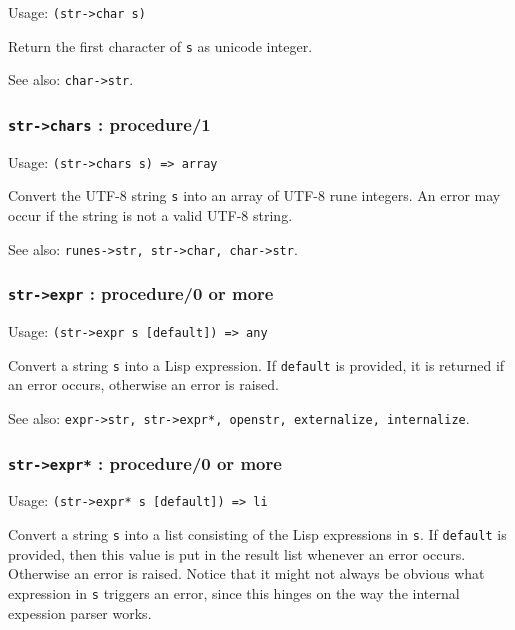 \documentclass[
]{article}
\newcommand{\passthrough}[1]{#1}
\begin{document}
Usage: \passthrough{\lstinline!(str->char s)!}

Return the first character of \passthrough{\lstinline!s!} as unicode
integer.

See also: \passthrough{\lstinline!char->str!}.

\hypertarget{str-chars-procedure1}{%
\subsubsection{\texorpdfstring{\texttt{str-\textgreater{}chars} :
procedure/1}{str-\textgreater chars : procedure/1}}\label{str-chars-procedure1}}

Usage: \passthrough{\lstinline!(str->chars s) => array!}

Convert the UTF-8 string \passthrough{\lstinline!s!} into an array of
UTF-8 rune integers. An error may occur if the string is not a valid
UTF-8 string.

See also: \passthrough{\lstinline!runes->str, str->char, char->str!}.

\hypertarget{str-expr-procedure0-or-more}{%
\subsubsection{\texorpdfstring{\texttt{str-\textgreater{}expr} :
procedure/0 or
more}{str-\textgreater expr : procedure/0 or more}}\label{str-expr-procedure0-or-more}}

Usage: \passthrough{\lstinline!(str->expr s [default]) => any!}

Convert a string \passthrough{\lstinline!s!} into a Lisp expression. If
\passthrough{\lstinline!default!} is provided, it is returned if an
error occurs, otherwise an error is raised.

See also:
\passthrough{\lstinline!expr->str, str->expr*, openstr, externalize, internalize!}.

\hypertarget{str-expr-procedure0-or-more-1}{%
\subsubsection{\texorpdfstring{\texttt{str-\textgreater{}expr*} :
procedure/0 or
more}{str-\textgreater expr* : procedure/0 or more}}\label{str-expr-procedure0-or-more-1}}

Usage: \passthrough{\lstinline!(str->expr* s [default]) => li!}

Convert a string \passthrough{\lstinline!s!} into a list consisting of
the Lisp expressions in \passthrough{\lstinline!s!}. If
\passthrough{\lstinline!default!} is provided, then this value is put in
the result list whenever an error occurs. Otherwise an error is raised.
Notice that it might not always be obvious what expression in
\passthrough{\lstinline!s!} triggers an error, since this hinges on the
way the internal expession parser works.
\end{document}
